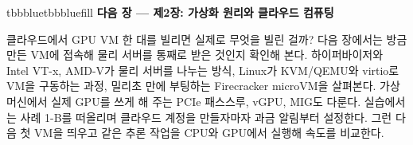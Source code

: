 \vspace{5.0pt}

\begin{calloutbox}{tbbblue}{tbbbluefill}
{\normalsize\bfseries\color{tbbblue}다음 장 — 제2장: 가상화 원리와 클라우드 컴퓨팅}\par\vspace{3pt}
클라우드에서 GPU VM 한 대를 빌리면 실제로 무엇을 빌린 걸까? 다음 장에서는 방금 만든 VM에 접속해 물리 서버를 통째로 받은 것인지 확인해 본다. 하이퍼바이저와 Intel VT-x, AMD-V가 물리 서버를 나누는 방식, Linux가 KVM/QEMU와 virtio로 VM을 구동하는 과정, 밀리초 만에 부팅하는 Firecracker microVM을 살펴본다. 가상 머신에서 실제 GPU를 쓰게 해 주는 PCIe 패스스루, vGPU, MIG도 다룬다. 실습에서는 사례 1-B를 떠올리며 클라우드 계정을 만들자마자 과금 알림부터 설정한다. 그런 다음 첫 VM을 띄우고 같은 추론 작업을 CPU와 GPU에서 실행해 속도를 비교한다.
\end{calloutbox}
